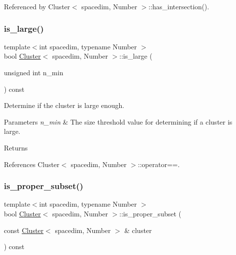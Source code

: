 Referenced by Cluster$<$ spacedim, Number $>$\+::has\+\_\+intersection().

\mbox{\label{classCluster_a55c608dd38d185c394e516d106fea02a}} 
\subsubsection{\texorpdfstring{is\+\_\+large()}{is\_large()}}
{\footnotesize\ttfamily template$<$int spacedim, typename Number $>$ \\
bool \hyperlink{classCluster}{Cluster}$<$ spacedim, Number $>$\+::is\+\_\+large (\begin{DoxyParamCaption}\item[{unsigned int}]{n\+\_\+min }\end{DoxyParamCaption}) const}

Determine if the cluster is large enough.


\begin{DoxyParams}{Parameters}
{\em n\+\_\+min} & The size threshold value for determining if a cluster is large. \\
\hline
\end{DoxyParams}
\begin{DoxyReturn}{Returns}

\end{DoxyReturn}


References Cluster$<$ spacedim, Number $>$\+::operator==.

\mbox{\label{classCluster_aaf45b6f7d9e629dd2fe648dd0231a559}} 
\subsubsection{\texorpdfstring{is\+\_\+proper\+\_\+subset()}{is\_proper\_subset()}}
{\footnotesize\ttfamily template$<$int spacedim, typename Number $>$ \\
bool \hyperlink{classCluster}{Cluster}$<$ spacedim, Number $>$\+::is\+\_\+proper\+\_\+subset (\begin{DoxyParamCaption}\item[{const \hyperlink{classCluster}{Cluster}$<$ spacedim, Number $>$ \&}]{cluster }\end{DoxyParamCaption}) const}

